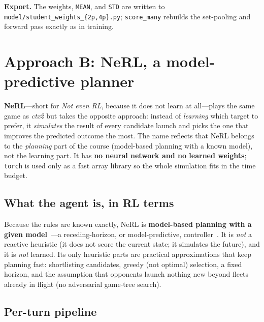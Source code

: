 \documentclass[conference]{IEEEtran}
\begin{document}
\textbf{Export.} The weights, \texttt{MEAN}, and \texttt{STD} are written to \texttt{model/student\_weights\_\{2p,4p\}.py}; \texttt{score\_many} rebuilds the set-pooling and forward pass exactly as in training.

\section{Approach B: NeRL, a model-predictive planner}
\label{sec:planner}

\textbf{NeRL}---short for \emph{Not even RL}, because it does not learn at all---plays the same game as \textit{ctx2} but takes the opposite approach: instead of \emph{learning} which target to prefer, it \emph{simulates} the result of every candidate launch and picks the one that improves the predicted outcome the most. The name reflects that NeRL belongs to the \emph{planning} part of the course (model-based planning with a known model), not the learning part. It has \textbf{no neural network and no learned weights}; \texttt{torch} is used only as a fast array library so the whole simulation fits in the time budget.

\subsection{What the agent is, in RL terms}

Because the rules are known exactly, NeRL is \textbf{model-based planning with a given model}~\cite{suttonbarto}---a receding-horizon, or model-predictive, controller~\cite{mpc1989}. It is \emph{not} a reactive heuristic (it does not score the current state; it simulates the future), and it is \emph{not} learned. Its only heuristic parts are practical approximations that keep planning fast: shortlisting candidates, greedy (not optimal) selection, a fixed horizon, and the assumption that opponents launch nothing new beyond fleets already in flight (no adversarial game-tree search).

\subsection{Per-turn pipeline}
\end{document}
